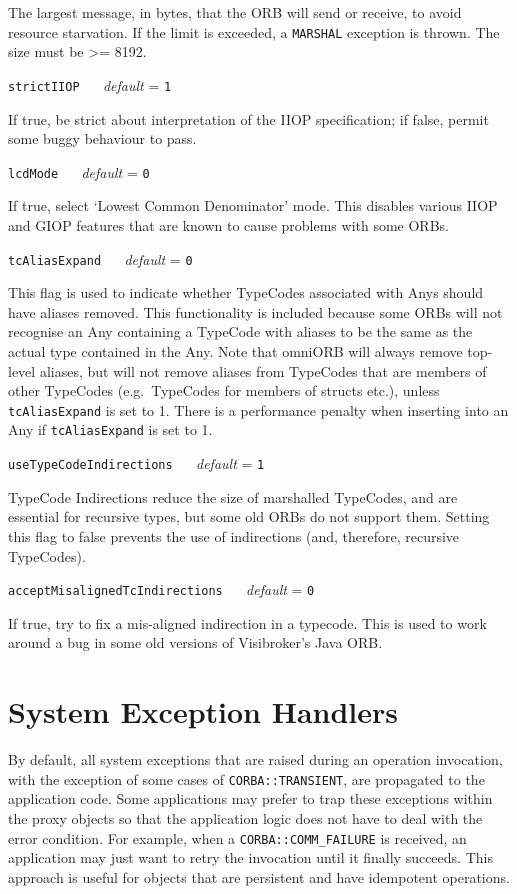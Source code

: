 \documentclass[11pt,twoside,a4paper]{book}
\makeatletter
\newcommand{\code}[1]{\texttt{#1}}
\newcommand{\confopt}[2]
  {\vspace{\baselineskip}\par\noindent\code{#1} ~~ \textit{default} =
   \code{#2}}
\renewcommand{\confopt}[2]
  {\vspace{\baselineskip}\par\noindent\code{#1} ~~ \textit{default} =
   \code{#2}\\[-1ex]\@afterheading}
\makeatother
\begin{document}
The largest message, in bytes, that the ORB will send or receive, to
avoid resource starvation. If the limit is exceeded, a \code{MARSHAL}
exception is thrown. The size must be >= 8192.

\confopt{strictIIOP}{1}

If true, be strict about interpretation of the IIOP specification; if
false, permit some buggy behaviour to pass.


\confopt{lcdMode}{0}

If true, select `Lowest Common Denominator' mode. This disables
various IIOP and GIOP features that are known to cause problems with
some ORBs.


\confopt{tcAliasExpand}{0}

This flag is used to indicate whether TypeCodes associated with Anys
should have aliases removed. This functionality is included because
some ORBs will not recognise an Any containing a TypeCode with aliases
to be the same as the actual type contained in the Any. Note that
omniORB will always remove top-level aliases, but will not remove
aliases from TypeCodes that are members of other TypeCodes (e.g.\
TypeCodes for members of structs etc.), unless \code{tcAliasExpand} is
set to 1. There is a performance penalty when inserting into an Any if
\code{tcAliasExpand} is set to 1.


\confopt{useTypeCodeIndirections}{1}

TypeCode Indirections reduce the size of marshalled TypeCodes, and are
essential for recursive types, but some old ORBs do not support them.
Setting this flag to false prevents the use of indirections (and,
therefore, recursive TypeCodes).


\confopt{acceptMisalignedTcIndirections}{0}

If true, try to fix a mis-aligned indirection in a typecode. This is
used to work around a bug in some old versions of Visibroker's Java
ORB.


\vspace{2\baselineskip}


\section{System Exception Handlers}

By default, all system exceptions that are raised during an operation
invocation, with the exception of some cases of
\code{CORBA::TRANSIENT}, are propagated to the application code. Some
applications may prefer to trap these exceptions within the proxy
objects so that the application logic does not have to deal with the
error condition. For example, when a \code{CORBA::COMM\_FAILURE} is
received, an application may just want to retry the invocation until
it finally succeeds. This approach is useful for objects that are
persistent and have idempotent operations.
\end{document}
